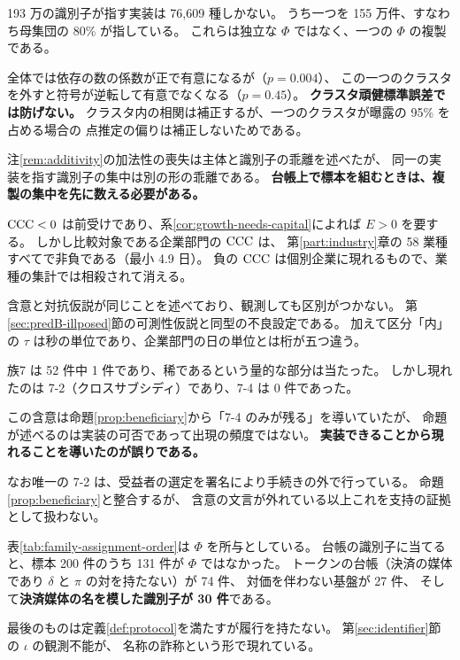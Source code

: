 \begin{remark}[複製の集中が推定を支配する]
\label{rem:clone-concentration}
193 万の識別子が指す実装は 76,609 種しかない。
うち一つを 155 万件、すなわち母集団の 80\% が指している。
これらは独立な $\Phi$ ではなく、一つの $\Phi$ の複製である。

全体では依存の数の係数が正で有意になるが（$p=0.004$）、
この一つのクラスタを外すと符号が逆転して有意でなくなる（$p=0.45$）。
\textbf{クラスタ頑健標準誤差では防げない。}
クラスタ内の相関は補正するが、一つのクラスタが曝露の 95\% を占める場合の
点推定の偏りは補正しないためである。

注\ref{rem:additivity}の加法性の喪失は主体と識別子の乖離を述べたが、
同一の実装を指す識別子の集中は別の形の乖離である。
\textbf{台帳上で標本を組むときは、複製の集中を先に数える必要がある。}
\end{remark}

\begin{remark}[対照が識別されない]
\label{rem:phi3-illposed}
$\mathrm{CCC}<0$ は前受けであり、系\ref{cor:growth-needs-capital}によれば $E>0$ を要する。
しかし比較対象である企業部門の $\mathrm{CCC}$ は、
第\ref{part:industry}章の 58 業種すべてで非負である（最小 4.9 日）。
負の $\mathrm{CCC}$ は個別企業に現れるもので、業種の集計では相殺されて消える。

含意と対抗仮説が同じことを述べており、観測しても区別がつかない。
第\ref{sec:predB-illposed}節の可測性仮説と同型の不良設定である。
加えて区分「内」の $\tau$ は秒の単位であり、企業部門の日の単位とは桁が五つ違う。
\end{remark}

\begin{remark}[実装できることと現れることは別である]
\label{rem:implementable-not-observed}
族7 は 52 件中 1 件であり、稀であるという量的な部分は当たった。
しかし現れたのは 7-2（クロスサブシディ）であり、7-4 は 0 件であった。

この含意は命題\ref{prop:beneficiary}から「7-4 のみが残る」を導いていたが、
命題が述べるのは実装の可否であって出現の頻度ではない。
\textbf{実装できることから現れることを導いたのが誤りである。}

なお唯一の 7-2 は、受益者の選定を署名により手続きの外で行っている。
命題\ref{prop:beneficiary}と整合するが、
含意の文言が外れている以上これを支持の証拠として扱わない。
\end{remark}

\begin{remark}[判定順序の前に一段が要る]
\label{rem:is-it-phi}
表\ref{tab:family-assignment-order}は $\Phi$ を所与としている。
台帳の識別子に当てると、標本 200 件のうち 131 件が $\Phi$ ではなかった。
トークンの台帳（決済の媒体であり $\delta$ と $\pi$ の対を持たない）が 74 件、
対価を伴わない基盤が 27 件、
そして\textbf{決済媒体の名を模した識別子が 30 件}である。

最後のものは定義\ref{def:protocol}を満たすが履行を持たない。
第\ref{sec:identifier}節の $\iota$ の観測不能が、
名称の詐称という形で現れている。
\end{remark}

